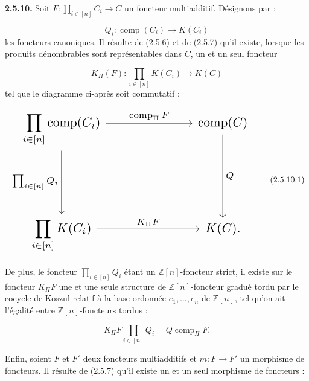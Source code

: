 %
\noindent\textbf{2.5.10.}\quad
{}
Soit
$F\colon\prod_{i\in[n]}C_i\longrightarrow C$ un foncteur multiadditif.
Désignons par :

\begin{equation*}
  Q_i\colon\operatorname{comp}(C_i)\longrightarrow K(C_i)
\end{equation*}
les foncteurs canoniques. Il résulte de (2.5.6) et de (2.5.7) qu'il existe,
lorsque les produits dénombrables sont représentables dans $C$, un et un
seul foncteur

\begin{equation*}
  K_{\Pi}(F)\colon
  \prod_{i\in[n]}K(C_i)\longrightarrow K(C)
\end{equation*}
tel que le diagramme ci-après soit commutatif :

\begin{equation}
  \resizebox{0.84\textwidth}{!}{%
    $\begin{tikzcd}[ampersand replacement=\&,column sep=6.8em,row sep=5.0em]
      \displaystyle\prod_{i\in[n]}\operatorname{comp}(C_i)
        \arrow[r,"{\operatorname{comp}_{\Pi}F}"]
        \arrow[d,"{\prod_{i\in[n]}Q_i}"']
        \& \operatorname{comp}(C)
          \arrow[d,"Q"] \\
      \displaystyle\prod_{i\in[n]}K(C_i)
        \arrow[r,"{K_{\Pi}F}"]
        \& K(C)\mathpunct{.}
    \end{tikzcd}$%
  }
  \tag{2.5.10.1}
\end{equation}

De plus, le foncteur $\prod_{i\in[n]}Q_i$ étant un
$\mathbb Z[n]$-foncteur strict, il existe sur le foncteur $K_{\Pi}F$ une et
une seule structure de $\mathbb Z[n]$-foncteur gradué tordu par le cocycle de
Koszul relatif à la base ordonnée $e_1,\ldots,e_n$ de $\mathbb Z[n]$, tel
qu'on ait l'égalité entre $\mathbb Z[n]$-foncteurs tordus :

\begin{equation}
  K_{\Pi}F\prod_{i\in[n]}Q_i
  =Q\operatorname{comp}_{\Pi}F.
  \tag{2.5.10.2}
\end{equation}

Enfin, soient $F$ et $F'$ deux foncteurs multiadditifs et
$m\colon F\longrightarrow F'$ un morphisme de foncteurs. Il résulte de
(2.5.7) qu'il existe un et un seul morphisme de foncteurs :


